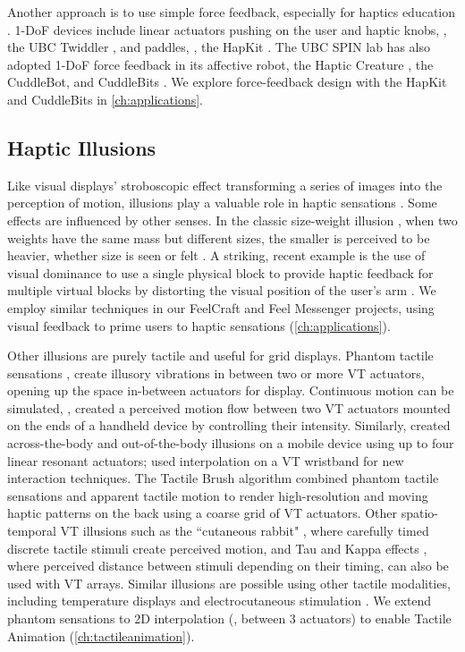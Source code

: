 Another approach is to use simple force feedback, especially for haptics education \cite{Jones2014}.
1-DoF devices include linear actuators pushing on the user and haptic knobs, \eg, the UBC Twiddler \cite{Shaver2003,Enriquez2003,MacLean2009a}, and paddles, \eg, the HapKit \cite{Martinez2016}.
The UBC SPIN lab has also adopted 1-DoF force feedback in its affective robot, the Haptic Creature \cite{Yohanan2011affectdisplay,Yohanan2011affectivetouch}, the CuddleBot, and CuddleBits \cite{cang2015cuddlebits}.
We explore force-feedback design with the HapKit and CuddleBits in \autoref{ch:applications}.


\subsection{Haptic Illusions}
Like visual displays' stroboscopic effect transforming a series of images into the perception of motion, illusions play a valuable role in haptic sensations \cite{Hayward2016}.
Some effects are influenced by other senses.
In the classic size-weight illusion \cite{charpentier1891analyse}, when two weights have the same mass but different sizes, the smaller is perceived to be heavier, whether size is seen or felt \cite{Hayward2016}.
A striking, recent example is the use of visual dominance to use a single physical block to provide haptic feedback for multiple virtual blocks by distorting the visual position of the user's arm \cite{Azmandian2016}.
We employ similar techniques in our FeelCraft and Feel Messenger projects, using visual feedback to prime users to haptic sensations (\autoref{ch:applications}).

Other illusions are purely tactile and useful for grid displays.
Phantom tactile sensations \cite{Alles1970}, create illusory vibrations in between two or more VT actuators, opening up the space in-between actuators for display.
Continuous motion can be simulated, \eg, \citet{Seo2010} created a perceived motion flow between two VT actuators mounted on the ends of a handheld device by controlling their intensity.
Similarly, \citet{Lee2012a} created across-the-body and out-of-the-body illusions on a mobile device using up to four %
linear resonant actuators; \citet{Gupta2016} used interpolation on a VT wristband for new interaction techniques.
The Tactile Brush algorithm \cite{Israr2011a} combined phantom tactile sensations and apparent tactile motion to render high-resolution and moving haptic patterns on the back using a coarse grid of VT actuators. 
Other spatio-temporal VT illusions such as the ``cutaneous rabbit"  \cite{Tan2009}, where carefully timed discrete tactile stimuli create perceived motion, and Tau and Kappa effects \cite{Hayward2008,Hayward2016}, where perceived distance between stimuli depending on their timing, can also be used with VT arrays.
Similar illusions are possible using other tactile modalities, including temperature displays \cite{Singhal2016} and electrocutaneous stimulation \cite{Tanie1980}.
We extend phantom sensations to 2D interpolation (\eg, between 3 actuators) to enable Tactile Animation (\autoref{ch:tactileanimation}).




